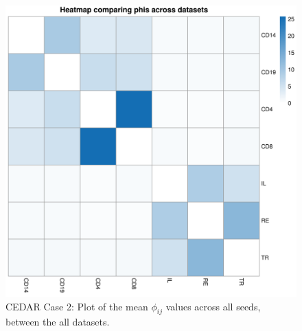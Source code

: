 \documentclass[14pt]{extarticle} %
\begin{document}
	\begin{figure}[h]
		\centering
		\includegraphics[scale=0.75]{Images/Biology_data/Set_1000/All_datasets/Phi_heatmap_1.png}
		\caption{CEDAR Case 2: Plot of the mean $\phi_{ij}$ values across all seeds, between the all datasets.}
		\label{fig:results:cedar_2:mdi_phi_heatmap}
	\end{figure}
	
	
	
	
\end{document}
